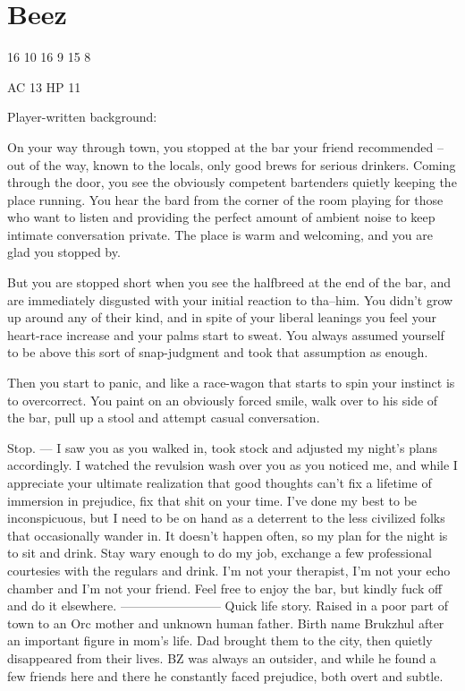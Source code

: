 \section{Beez}\label{sec:beez}
   \medskip
{}

16
10
16
9
15
8

AC 13
HP 11

\hrulefill
Player-written background:

On your way through town, you stopped at the bar your friend recommended -- out of the way, known to the locals, only good brews for serious drinkers. Coming through the door, you see the obviously competent bartenders quietly keeping the place running. You hear the bard from the corner of the room playing for those who want to listen and providing the perfect amount of ambient noise to keep intimate conversation private. The place is warm and welcoming, and you are glad you stopped by.

But you are stopped short when you see the halfbreed at the end of the bar, and are immediately disgusted with your initial reaction to tha--him. You didn't grow up around any of their kind, and in spite of your liberal leanings you feel your heart-race increase and your palms start to sweat. You always assumed yourself to be above this sort of snap-judgment and took that assumption as enough.

Then you start to panic, and like a race-wagon that starts to spin your instinct is to overcorrect. You paint on an obviously forced smile, walk over to his side of the bar, pull up a stool and attempt casual conversation.

Stop.
---
I saw you as you walked in, took stock and adjusted my night’s plans accordingly. I watched the revulsion wash over you as you noticed me, and while I appreciate your ultimate realization that good thoughts can’t fix a lifetime of immersion in prejudice, fix that shit on your time. I’ve done my best to be inconspicuous, but I need to be on hand as a deterrent to the less civilized folks that occasionally wander in. It doesn’t happen often, so my plan for the night is to sit and drink. Stay wary enough to do my job, exchange a few professional courtesies with the regulars and drink. I’m not your therapist, I’m not your echo chamber and I’m not your friend. Feel free to enjoy the bar, but kindly fuck off and do it elsewhere.
------------------------
Quick life story. Raised in a poor part of town to an Orc mother and unknown human father. Birth name Brukzhul after an important figure in mom’s life. Dad brought them to the city, then quietly disappeared from their lives. BZ was always an outsider, and while he found a few friends here and there he constantly faced prejudice, both overt and subtle.

